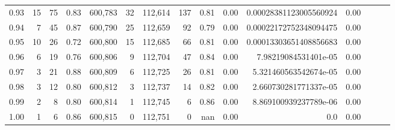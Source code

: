 \begin{tabular}{rrrrrrrrrrrrrrr}
0.93 &      15 &     75 &  0.83 &  600,783 &       32 &  112,614 &      137 &  0.81 &  0.00 &  0.00028381123005560924 &      0.00 \\
0.94 &       7 &     45 &  0.87 &  600,790 &       25 &  112,659 &       92 &  0.79 &  0.00 &  0.00022172752348094475 &      0.00 \\
0.95 &      10 &     26 &  0.72 &  600,800 &       15 &  112,685 &       66 &  0.81 &  0.00 &  0.00013303651408856683 &      0.00 \\
0.96 &       6 &     19 &  0.76 &  600,806 &        9 &  112,704 &       47 &  0.84 &  0.00 &    7.98219084531401e-05 &      0.00 \\
0.97 &       3 &     21 &  0.88 &  600,809 &        6 &  112,725 &       26 &  0.81 &  0.00 &   5.321460563542674e-05 &      0.00 \\
0.98 &       3 &     12 &  0.80 &  600,812 &        3 &  112,737 &       14 &  0.82 &  0.00 &   2.660730281771337e-05 &      0.00 \\
0.99 &       2 &      8 &  0.80 &  600,814 &        1 &  112,745 &        6 &  0.86 &  0.00 &   8.869100939237789e-06 &      0.00 \\
1.00 &       1 &      6 &  0.86 &  600,815 &        0 &  112,751 &        0 &   nan &  0.00 &                     0.0 &      0.00 \\
\bottomrule
\end{tabular}
